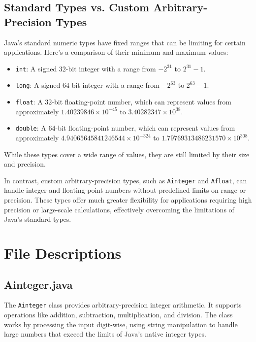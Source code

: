 \documentclass[12pt]{article}
\begin{document}
\subsection{Standard Types vs. Custom Arbitrary-Precision Types}

Java's standard numeric types have fixed ranges that can be limiting for certain applications. Here’s a comparison of their minimum and maximum values:

\begin{itemize}
    \item \texttt{int}: A signed 32-bit integer with a range from \(-2^{31}\) to \(2^{31} - 1\).
    \item \texttt{long}: A signed 64-bit integer with a range from \(-2^{63}\) to \(2^{63} - 1\).
    \item \texttt{float}: A 32-bit floating-point number, which can represent values from approximately \(1.40239846 \times 10^{-45}\) to \(3.40282347 \times 10^{38}\).
    \item \texttt{double}: A 64-bit floating-point number, which can represent values from approximately \(4.94065645841246544 \times 10^{-324}\) to \(1.79769313486231570 \times 10^{308}\).
\end{itemize}

While these types cover a wide range of values, they are still limited by their size and precision.

In contrast, custom arbitrary-precision types, such as \texttt{Ainteger} and \texttt{Afloat}, can handle integer and floating-point numbers without predefined limits on range or precision. These types offer much greater flexibility for applications requiring high precision or large-scale calculations, effectively overcoming the limitations of Java's standard types.

\section{File Descriptions}
\subsection{Ainteger.java}
The \texttt{Ainteger} class provides arbitrary-precision integer arithmetic. It supports operations like addition, subtraction, multiplication, and division. The class works by processing the input digit-wise, using string manipulation to handle large numbers that exceed the limits of Java's native integer types.
\end{document}
